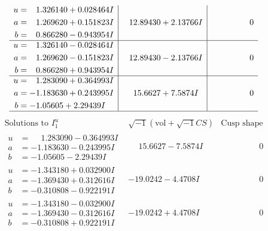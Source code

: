 \documentclass[1p]{elsarticle_modified}
\theoremstyle{definition}
\newcommand{\I}{\sqrt{-1}}
\begin{document}
$$\begin{array}{c|c|c}
\begin{aligned}
u &= \phantom{-}1.326140 + 0.028464 I \\
a &= \phantom{-}1.269620 + 0.151823 I \\
b &= \phantom{-}0.866280 - 0.943954 I\end{aligned}
 & \phantom{-}12.89430 + 2.13766 I & \phantom{-0.000000 } 0 \\ \hline\begin{aligned}
u &= \phantom{-}1.326140 - 0.028464 I \\
a &= \phantom{-}1.269620 - 0.151823 I \\
b &= \phantom{-}0.866280 + 0.943954 I\end{aligned}
 & \phantom{-}12.89430 - 2.13766 I & \phantom{-0.000000 } 0 \\ \hline\begin{aligned}
u &= \phantom{-}1.283090 + 0.364993 I \\
a &= -1.183630 + 0.243995 I \\
b &= -1.05605 + 2.29439 I\end{aligned}
 & \phantom{-}15.6627 + 7.5874 I & \phantom{-0.000000 } 0\\
 \hline 
 \end{array}$$\newpage$$\begin{array}{c|c|c}  
\text{Solutions to }I^u_{1}& \I (\text{vol} + \sqrt{-1}CS) & \text{Cusp shape}\\
 \hline 
\begin{aligned}
u &= \phantom{-}1.283090 - 0.364993 I \\
a &= -1.183630 - 0.243995 I \\
b &= -1.05605 - 2.29439 I\end{aligned}
 & \phantom{-}15.6627 - 7.5874 I & \phantom{-0.000000 } 0 \\ \hline\begin{aligned}
u &= -1.343180 + 0.032900 I \\
a &= -1.369430 + 0.312616 I \\
b &= -0.310808 - 0.922191 I\end{aligned}
 & -19.0242 - 4.4708 I & \phantom{-0.000000 } 0 \\ \hline\begin{aligned}
u &= -1.343180 - 0.032900 I \\
a &= -1.369430 - 0.312616 I \\
b &= -0.310808 + 0.922191 I\end{aligned}
 & -19.0242 + 4.4708 I & \phantom{-0.000000 } 0 \\ \hline\begin{aligned}

\end{aligned}
\end{array}$$
\end{document}
